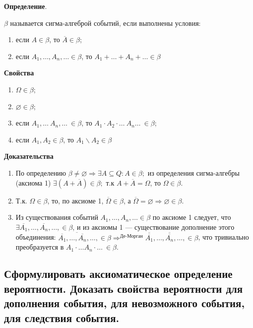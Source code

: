 \textbf{Определение}. 

$\beta$ называется сигма-алгеброй событий, если выполнены условия: 
\begin{enumerate}
	\item если $A \in \beta$, то $\overline{A} \in \beta$;
	\item если $A_1, \dots, A_n, \dots \in \beta$, то $A_1 + \dots + A_n + \dots \in \beta$
\end{enumerate}

\textbf{Свойства}

\begin{enumerate}
	
	\item $\Omega \in \beta$;
	\item $\varnothing \in \beta$;
	\item если $A_1, \dots\ A_n, \dots\ \in \beta$, то $A_1 \cdot A_2 \cdot \dots\ A_n \dots\ \in \beta$;
	\item если $A_1, A_2 \in \beta$, то $A_1 \backslash A_2 \in \beta$
\end{enumerate}


\textbf{Доказательства}

\begin{enumerate}
	\item По определению $\beta \neq \varnothing \Rightarrow \exists A \subseteq Q: A \in \beta;$ из определения сигма-алгебры (аксиома 1) $\exists (A + \overline{A}) \in \beta;$ т.к $A + \overline{A} = \Omega$, то $\Omega \in \beta$.
	\item Т.к. $\Omega \in \beta$, то, по аксиоме 1, $\overline{\Omega} \in \beta$, а $\overline{\Omega} = \varnothing \Rightarrow \varnothing \in \beta$. 
	\item Из существования событий $A_1, \dots, A_n, \dots \in \beta$ по аксиоме 1 следует, что $\exists \overline{A_1}, \dots, \overline{A_n}, \dots, \in \beta$, и из аксиомы 1 --- существование дополнение этого объединения: $\overline{\overline{A_1}, \dots, \overline{A_n}, \dots}, \in \beta \Rightarrow^{\text{Де-Морган}} \overline{\overline{A_1}}, \dots, \overline{\overline{A_n}}, \dots, \in \beta$, что тривиально преобразуется в $A_1 \cdot \dots  A_n \cdot \dots\  \in \beta$.
\end{enumerate}


\subsection{Сформулировать аксиоматическое определение вероятности. Доказать свойства вероятности для дополнения события, для невозможного события, для следствия события.}


